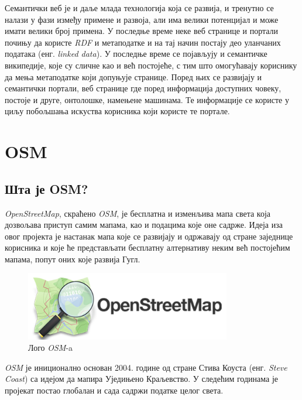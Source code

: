 \documentclass[12pt,oneside]{memoir}
\begin{document}
Семантички веб је и даље млада технологија која се развија, и тренутно се налази у фази између примене и развоја, али има велики потенцијал и може имати велики број примена. У последње време неке веб странице и портали почињу да користе \textit{RDF} и метаподатке и на тај начин постају део уланчаних података (енг. \textit{linked data}). У последње време се појављују и семантичке википедије, које су сличне као и већ постојеће, с тим што омогућавају кориснику да мења метаподатке који допуњује странице. Поред њих се развијају и семантички портали, веб странице где поред информација доступних човеку, постоје и друге, онтолошке, намењене машинама. Те информације се користе у циљу побољшања искуства корисника који користе те портале. \cite{semantic}


\chapter{OSM}
\label{chp:osm}

\section{Шта је OSM?}
\label{sec:osm_opis}

\textit{OpenStreetMap}, скраћено \textit{OSM}, је бесплатна и изменљива мапа света која дозвољава приступ самим мапама, као и подацима које оне садрже. Идеја иза овог пројекта је настанак мапа које се развијају и одржавају од стране заједнице корисника и које ће представљати бесплатну алтернативу неким већ постојећим мапама, попут оних које развија Гугл. \cite{osm_wiki}

\begin{figure}[!ht]
  \centering
  \includegraphics[width=0.8\textwidth]{pictures/openstreetmaps_logo.png}
  \caption{Лого \textit{OSM}-a}
  \label{fig:osm_logo}
\end{figure}

\textit{OSM} је иниционално основан 2004. године од стране Стива Коуста (енг. \textit{Steve Coast}) са идејом да мапира Уједињено Краљевство. У следећим годинама је пројекат постао глобалан и сада садржи податке целог света. \cite{osm_wiki}
\end{document}
